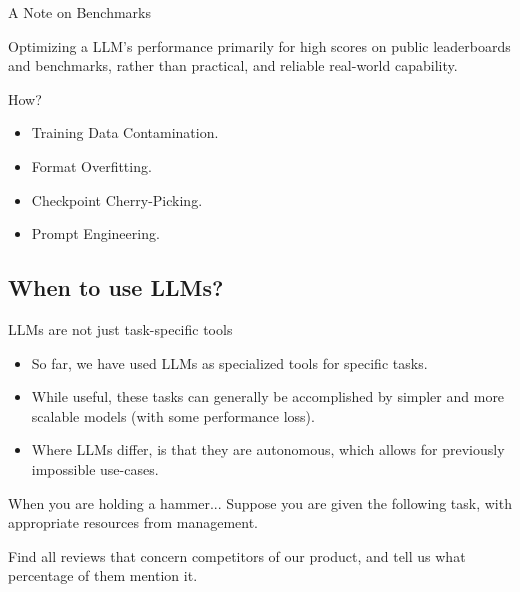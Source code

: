 \documentclass[24pt]{beamer}
\newcommand{\subsectionslide}{
	 \begin{frame}
		\sectionpage
		\subsectionpage
	\end{frame}
}
\begin{document}
\begin{frame}[label=benchmaxing2]{A Note on Benchmarks}
	\begin{definition}[Benchmaxxing]
		Optimizing a LLM's performance primarily for high scores on public \alert{leaderboards} and \alert{benchmarks}, rather than practical, and reliable real-world capability. 
	\end{definition}
	
	How?
	\begin{itemize}
		\item Training Data Contamination.
		\item Format Overfitting.
		\item Checkpoint Cherry-Picking.
		\item Prompt Engineering.
	\end{itemize}

\end{frame}


\subsection{When to use LLMs?}
\subsectionslide

\begin{frame}{LLMs are not just task-specific tools}
	\begin{itemize}
		\item So far, we have used LLMs as specialized tools for specific tasks.
		\item While useful, these tasks can generally be accomplished by \alert{simpler} and more \alert{scalable} models (with some performance loss).
		\item Where LLMs differ, is that they are \alert{autonomous}, which allows for \alert{previously impossible} use-cases.
	\end{itemize}
\end{frame}

\begin{frame}{When you are holding a hammer...}
	Suppose you are given the following task, with appropriate resources from management.
	\begin{exampleblock}{}
		Find all reviews that concern competitors of our product, and tell us what percentage of them mention it.
	\end{exampleblock}
\end{frame}
\end{document}
